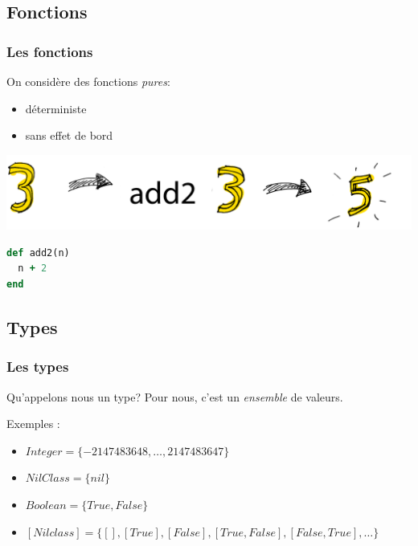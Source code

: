\documentclass{beamer}
\begin{document}
\subsection{Fonctions}
\begin{frame}[fragile]
\frametitle{Les fonctions}
\begin{block}{}
On considère des fonctions \emph{pures}:
\begin{itemize}
\item déterministe
\item sans effet de bord
\end{itemize}
\end{block}
\begin{center}
\includegraphics[scale=0.2]{fct.png}
\end{center}
\pause
\begin{block}{}
\begin{lstlisting}[language=ruby,basicstyle=\ttfamily,keywordstyle=\color{red}]
def add2(n)
  n + 2
end
\end{lstlisting}
\end{block}
\end{frame}

\subsection{Types}
\begin{frame}
\frametitle{Les types}
\begin{block}{Qu'appelons nous un type?}
Pour nous, c'est un \emph{ensemble} de valeurs.
\end{block}
\pause
\begin{exampleblock}{Exemples :}
\begin{itemize}
\item $Integer = \{-2 147 483 648, \dots, 2 147 483 647\}$
\item $NilClass = \{nil\}$
\item $Boolean = \{True, False\}$
\pause
\item $[Nilclass] = \{[], [True], [False], [True, False], [False, True], \dots\}$
\end{itemize}
\end{exampleblock}
\end{frame}
\end{document}
